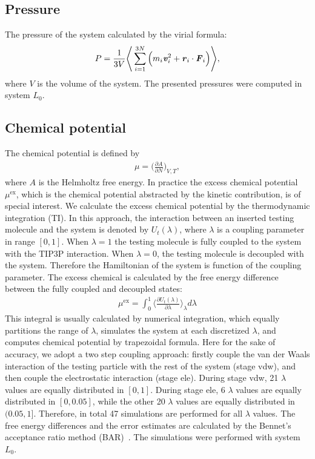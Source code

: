 \documentclass[aip,jcp,a4paper,preprint,unsortedaddress,onecolumn,fleqn]{revtex4-1}
\newcommand{\vect}[1]{\textbf{\textit{#1}}}
\newcommand{\exc}{\textrm{ex}}
\newcommand{\systemla}{L_0}
\begin{document}
\subsection{Pressure}
The pressure of the system calculated by the virial formula:
\begin{align}
  P = \frac1{3V}
  \Bigg\langle
  \sum_{i=1}^{3N} \Big( m_i\vect v_i^2 + \vect r_i\cdot \vect F_i \Big)
  \Bigg\rangle,
\end{align}
where $V$ is the volume of the system. The presented pressures were computed in system $\systemla$.

\subsection{Chemical potential}

The chemical potential is defined by
\begin{align}
  \mu = \Big(\frac{\partial A}{\partial N}\Big)_{V,T},
\end{align}
where $A$ is the Helmholtz free energy.
In practice the excess chemical potential $\mu^\exc$, which is the
chemical potential abstracted by the kinetic contribution, is of
special interest. We calculate the excess chemical potential by the
thermodynamic integration (TI). In this approach, the interaction
between an inserted testing molecule and the system is
denoted by $U_t(\lambda)$, where $\lambda$
is a coupling parameter in range $[0,1]$.
When $\lambda = 1$ the testing molecule is fully coupled to the system
with the TIP3P interaction. When $\lambda=0$, the testing molecule
is decoupled with the system.
Therefore the
Hamiltonian of the system is function of the coupling parameter. The
excess chemical is calculated by the free energy difference between
the fully coupled and decoupled states:
\begin{align}
  \mu^\exc = \int_0^1 \Big\langle \frac{\partial U_t(\lambda)}{\partial \lambda} \Big\rangle_\lambda d\lambda
\end{align}
This integral is usually calculated by numerical integration, which
equally partitions the range of $\lambda$, simulates the system at each
discretized $\lambda$, and computes chemical potential by trapezoidal formula.
Here for the sake of accuracy, 
we adopt a two step coupling approach: firstly couple the van der Waals
interaction of the testing particle with the rest of the system (stage vdw),
and then couple the electrostatic interaction (stage ele).
During stage vdw, 21 $\lambda$ values are equally
distributed in $[0,1]$.  During stage ele, 6 $\lambda$ values are
equally distributed in $[0,0.05]$, while the other 20 $\lambda$ values
are equally distributed in $(0.05, 1]$. Therefore, in total 47
simulations are performed for all $\lambda$ values.
The free energy differences and the error estimates are calculated
by the Bennet's acceptance ratio method (BAR)~\cite{bennett1976efficient}. 
The simulations were performed with system $\systemla$.
\end{document}
